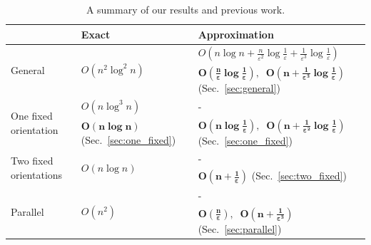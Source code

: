 \documentclass[english,a4paper, cleveref, autoref, thm-restate, nolineno]{socg-lipics-v2021}
\theoremstyle{star}
\theoremstyle{claimstar}
\newcommand{\eps}{\ensuremath{\varepsilon}}
\begin{document}











\begin{table}[t]
\begin{tabular} {p{} m{} m{}} 
\toprule
~ & \textbf{Exact} & \textbf{Approximation}  \\ 
\midrule

\multirow{2}{*}{General} & \multirow{2}{*}{$O(n^2\log^2n) $~\cite{jaromczyk1995}} & $O(n\log n + \frac{n}{\eps^2} \log \frac{1}{\eps} + \frac{1}{\eps^3}\log \frac{1}{\eps})$~\cite{agarwalTwo, chan2006faster}\\
\cmidrule(lr){3-3} 
& & 
 $\boldsymbol{O(\frac{n}{\eps} \log \frac{1}{\eps}) } $$,\:$ $\boldsymbol{O(n + \frac{1}{\eps^3} \log \frac{1}{\eps}) }$ (Sec.~\ref{sec:general}) 
\\
\cmidrule(r){1-1} \cmidrule(l){2-3} 




\multirow{2}{*}{One fixed orientation} &  $O(n  \log^3 n)$~\cite{ahn2024constrained}  & - \\
\cmidrule(lr){2-2}  \cmidrule(lr){3-3} 
& $\boldsymbol{O(n \log n)}$ (Sec.~\ref{sec:one_fixed})
& $\boldsymbol{O(n \log \frac{1}{\eps})}$$,\:$ $\boldsymbol{O(n + \frac{1}{\eps^2} \log \frac{1}{\eps}) }$  (Sec.~\ref{sec:one_fixed})   \\
\cmidrule(r){1-1} \cmidrule(l){2-3} 

\multirow{2}{*}{Two fixed orientations} & \multirow{2}{*}{$O(n \log n)$~\cite{ahn2024constrained} } & - \\
\cmidrule(lr){3-3} 
& & 
$\boldsymbol{O(n + \frac{1}{\eps})}$  (Sec.~\ref{sec:two_fixed})  \\
\cmidrule(r){1-1} \cmidrule(l){2-3} 

\multirow{2}{*}{Parallel} & \multirow{2}{*}{$O(n^2)$~\cite{bae2020minimum}} & - \\
\cmidrule(lr){3-3} 
& & 
 $\boldsymbol{O(\frac{n}{\eps})}$$,\:$  $\boldsymbol{O(n + \frac{1}{\eps^3})}$ (Sec.~\ref{sec:parallel})  \\
\bottomrule
\end{tabular}
\caption{A summary of our results and previous work.}
\label{table:result}
\end{table}
\end{document}
